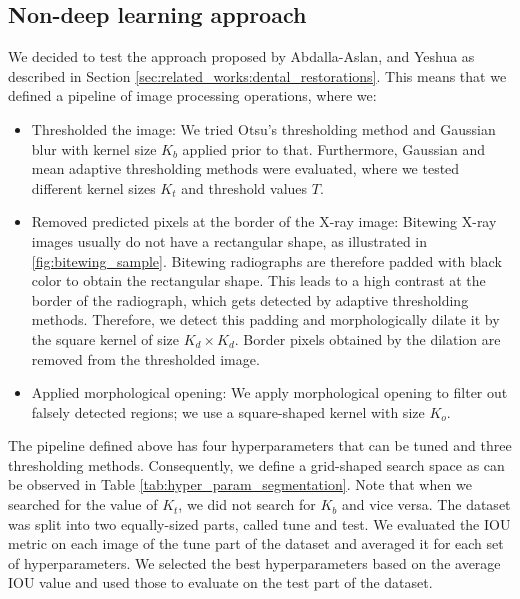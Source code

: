 \subsection{Non-deep learning approach}
\label{sec:methods:seg_nondl}
We decided to test the approach proposed by Abdalla-Aslan, and Yeshua \cite{AbdallaAslan2020, Yeshua2019} as described in Section \ref{sec:related_works:dental_restorations}. This means that we defined a pipeline of image processing operations, where we:
\begin{itemize}
    \item Thresholded the image: We tried Otsu's thresholding method and Gaussian blur with kernel size $K_b$ applied prior to that. Furthermore, Gaussian and mean adaptive thresholding methods were evaluated, where we tested different kernel sizes $K_t$ and threshold values $T$.
    \item Removed predicted pixels at the border of the X-ray image: Bitewing X-ray images usually do not have a rectangular shape, as illustrated in \ref{fig:bitewing_sample}. Bitewing radiographs are therefore padded with black color to obtain the rectangular shape. This leads to a high contrast at the border of the radiograph, which gets detected by adaptive thresholding methods. Therefore, we detect this padding and morphologically dilate it by the square kernel of size $K_d \times K_d$. Border pixels obtained by the dilation are removed from the thresholded image.
    \item Applied morphological opening: We apply morphological opening to filter out falsely detected regions; we use a square-shaped kernel with size $K_o$.
\end{itemize}

The pipeline defined above has four hyperparameters that can be tuned and three thresholding methods. Consequently, we define a grid-shaped search space as can be observed in Table \ref{tab:hyper_param_segmentation}. Note that when we searched for the value of $K_t$, we did not search for $K_b$ and vice versa.
The dataset was split into two equally-sized parts, called tune and test. We evaluated the IOU metric on each image of the tune part of the dataset and averaged it for each set of hyperparameters. We selected the best hyperparameters based on the average IOU value and used those to evaluate on the test part of the dataset.

